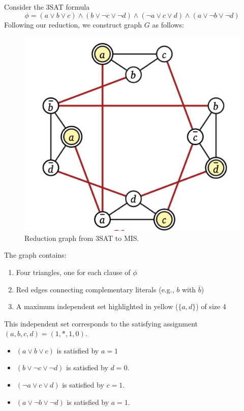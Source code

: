 \documentclass{article}
\begin{document}
      \begin{example}
        Consider the 3SAT formula 
        \begin{equation}
          \phi = (a \lor b \lor c) \land (b \lor \neg c \lor \neg d) \land (\neg a \lor c \lor d) \land (a \lor \neg b \lor \neg d)
        \end{equation}
        Following our reduction, we construct graph $G$ as follows:

        \begin{figure}[H]
          \centering 
          \includegraphics[scale=0.4]{img/mis_graph.png}
          \caption{Reduction graph from 3SAT to MIS. } 
          \label{fig:mis_graph}
        \end{figure}

        The graph contains:
        \begin{enumerate}
          \item Four triangles, one for each clause of $\phi$
          \item Red edges connecting complementary literals (e.g., $b$ with $\bar{b}$)
          \item A maximum independent set highlighted in yellow ($\{a, d\}$) of size 4
        \end{enumerate} 

        This independent set corresponds to the satisfying assignment $(a, b, c, d) = (1, \ast, 1, 0)$. 
        \begin{itemize}
          \item $(a \lor b \lor c)$ is satisfied by $a = 1$
          \item $(b \lor \neg c \lor \neg d)$ is satisfied by $d = 0$. 
          \item $(\neg a \lor c \lor d)$ is satisfied by $c = 1$. 
          \item $(a \lor \neg b \lor \neg d)$ is satisfied by $a = 1$. 
        \end{itemize}


\end{example}
\end{document}
